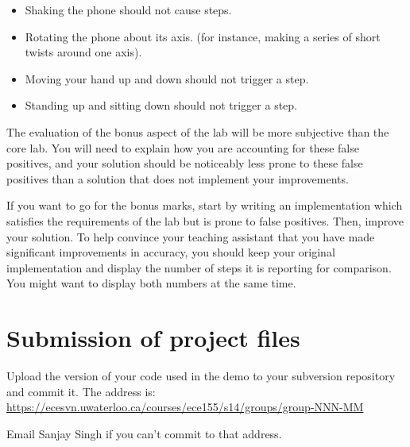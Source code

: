 \documentclass[10pt]{article}
\begin{document}
\begin{itemize}
\item Shaking the phone should not cause steps.
\item Rotating the phone about its axis. (for instance, making a series of short twists around one axis).
\item Moving your hand up and down should not trigger a step.
\item Standing up and sitting down should not trigger a step.
\end{itemize}

The evaluation of the bonus aspect of the lab will be more subjective than the core lab. You will need to explain how you are accounting for these false positives, and your solution should be noticeably less prone to these false positives than a solution that does not implement your improvements.

If you want to go for the bonus marks, start by writing an implementation which satisfies the requirements of the lab but is prone to false positives. Then, improve your solution. To help convince your teaching assistant that you have made significant improvements in accuracy, you should keep your original implementation and display the number of steps it is reporting for comparison. You might want to display both numbers at the same time.

\section{Submission of project files}

Upload the version of your code used in the demo to your subversion repository and commit it. The address is:
\url{https://ecesvn.uwaterloo.ca/courses/ece155/s14/groups/group-NNN-MM}

Email Sanjay Singh if you can't commit to that address.
\end{document}
